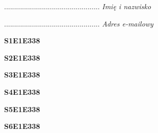 \begin{turn}{90}\begin{minipage}{\linewidth} \vspace{20mm} ................................................  \textit{Imię i nazwisko}\end{minipage}\end{turn}

\begin{turn}{90}\begin{minipage}{\linewidth} \vspace{20mm} ................................................  \textit{Adres e-mailowy}\end{minipage}\end{turn}

\begin{turn}{90}\huge \begin{minipage}{\linewidth} \vspace{10mm}\textbf{S1E1E338}\end{minipage}\end{turn}

\begin{turn}{90}\huge \begin{minipage}{\linewidth} \vspace{10mm}\textbf{S2E1E338}\end{minipage}\end{turn}

\begin{turn}{90}\huge \begin{minipage}{\linewidth} \vspace{10mm}\textbf{S3E1E338}\end{minipage}\end{turn}

\begin{turn}{90}\huge \begin{minipage}{\linewidth} \vspace{10mm}\textbf{S4E1E338}\end{minipage}\end{turn}

\begin{turn}{90}\huge \begin{minipage}{\linewidth} \vspace{10mm}\textbf{S5E1E338}\end{minipage}\end{turn}

\begin{turn}{90}\huge \begin{minipage}{\linewidth} \vspace{10mm}\textbf{S6E1E338}\end{minipage}\end{turn}

